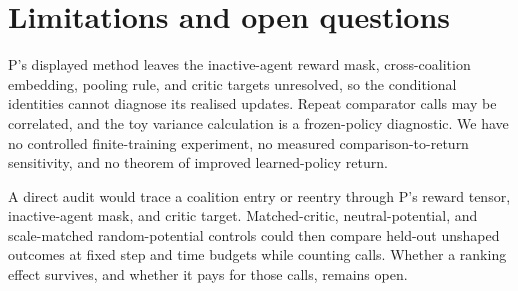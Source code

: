 \documentclass{article}
\begin{document}
\newpage
\section{Limitations and open questions}

P's displayed method leaves the inactive-agent reward mask, cross-coalition embedding, pooling rule, and
critic targets unresolved, so the conditional identities cannot diagnose its realised updates. Repeat
comparator calls may be correlated, and the toy variance calculation is a frozen-policy diagnostic. We have
no controlled finite-training experiment, no measured comparison-to-return sensitivity, and no theorem of
improved learned-policy return. %

A direct audit would trace a coalition entry or reentry through P's reward tensor, inactive-agent mask, and
critic target. Matched-critic, neutral-potential, and scale-matched random-potential controls could then
compare held-out unshaped outcomes at fixed step and time budgets while counting calls. Whether a ranking
effect survives, and whether it pays for those calls, remains open. %



\end{document}
